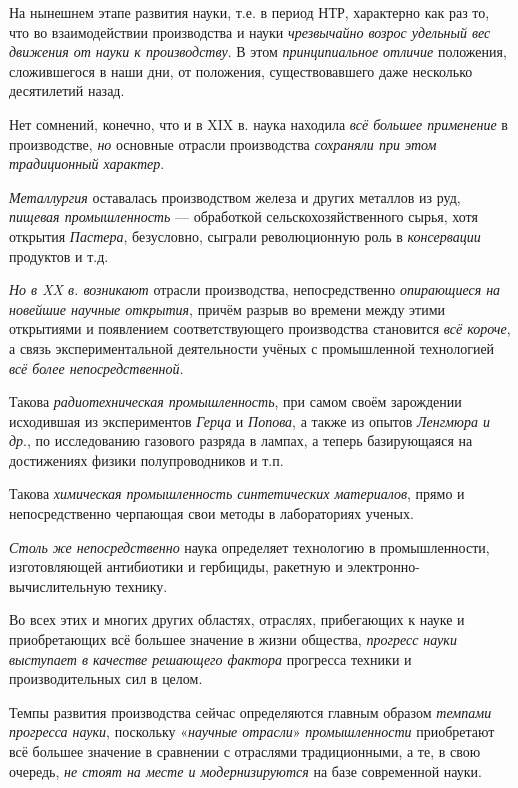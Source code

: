 \documentclass[a4paper,14pt,russian]{extreport}
\begin{document}
На нынешнем этапе развития науки, т.е. в период НТР, характерно как раз то, что во взаимодействии производства и науки \emph{чрезвычайно возрос удельный вес движения от науки к производству}. В этом \emph{принципиальное отличие} положения, сложившегося в наши дни, от положения, существовавшего даже несколько десятилетий назад.

Нет сомнений, конечно, что и в XIX в. наука находила \emph{всё большее применение} в производстве, \emph{но} основные отрасли производства \emph{сохраняли при этом традиционный характер}.

\emph{Металлургия} оставалась производством железа и других металлов из руд, \emph{пищевая промышленность} --- обработкой сельскохозяйственного сырья, хотя открытия \emph{Пастера}, безусловно, сыграли революционную роль в \emph{консервации} продуктов и т.д.

\emph{Но в XX в. возникают} отрасли производства, непосредственно \emph{опирающиеся на новейшие научные открытия}, причём разрыв во времени между этими открытиями и появлением соответствующего производства становится \emph{всё короче}, а связь экспериментальной деятельности учёных с промышленной технологией \emph{всё более непосредственной}.

Такова \emph{радиотехническая промышленность}, при самом своём зарождении исходившая из экспериментов \emph{Герца} и \emph{Попова}, а также из опытов \emph{Ленгмюра и др}., по исследованию газового разряда в лампах, а теперь базирующаяся на достижениях физики полупроводников и т.п.

Такова \emph{химическая промышленность синтетических материалов}, прямо и непосредственно черпающая свои методы в лабораториях ученых.

\emph{Столь же непосредственно} наука определяет технологию в промышленности, изготовляющей антибиотики и гербициды, ракетную и электронно-вычислительную технику.

Во всех этих и многих других областях, отраслях, прибегающих к науке и приобретающих всё большее значение в жизни общества, \emph{прогресс науки выступает в качестве решающего фактора} прогресса техники и производительных сил в целом.

Темпы развития производства сейчас определяются главным образом \emph{темпами прогресса науки}, поскольку «\emph{научные отрасли}» \emph{промышленности} приобретают всё большее значение в сравнении с отраслями традиционными, а те, в свою очередь, \emph{не стоят на месте и модернизируются} на базе современной науки.
\end{document}
